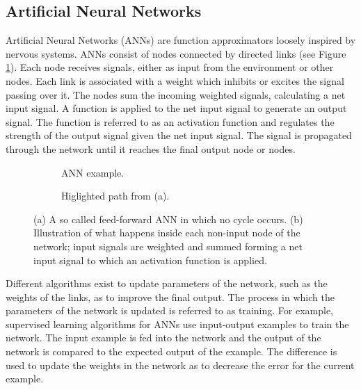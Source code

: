 \newpage
\subsection{Artificial Neural Networks}
\newline
{}
\newline
Artificial Neural Networks (ANNs) are function approximators loosely inspired by nervous systems.
ANNs consist of nodes connected by directed links (see Figure \ref{feedforward}). Each node receives signals, either as input from
the environment or other nodes. Each link is associated with a weight which inhibits or excites the signal passing
over it. The nodes sum the incoming weighted signals, calculating a net input signal. A function
is applied to the net input signal to generate an output signal. The function is referred to as an activation function
and regulates the strength of the output signal given the net input signal. The signal is propagated through the network
until it reaches the final output node or nodes.


\begin{figure}[htb]
    \begin{mdframed}
        \begin{subfigure}[b]{0.5\textwidth}
            \centering
            \resizebox{0.7\textwidth}{!}{}
            \caption{ANN example.}
            \label{feedforward}
        \end{subfigure}
        \begin{subfigure}[b]{0.5\textwidth}
            \centering
            \resizebox{0.9\textwidth}{!}{}
            \caption{Higlighted path from (a).}
            \label{neuron}
        \end{subfigure}
    \end{mdframed}
    \caption{(a) A so called feed-forward ANN in which no cycle occurs. (b) Illustration of what happens inside each non-input node of the network; input
                 signals are weighted and summed forming a net input signal to which an activation function is applied.}
\end{figure}


\newline
Different algorithms exist to update parameters of the network, such as the weights of the
links, as to improve the final output. The process in which the parameters of the network is updated
is referred to as training. For example, supervised learning algorithms for ANNs use input-output examples
to train the network. The input example is fed into the network and the output of the network is compared to
the expected output of the example. The difference is used to update the weights in the network as to decrease
the error for the current example.



